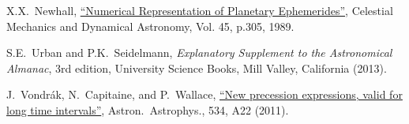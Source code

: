 \documentclass[12pt]{article}
\begin{document}
\begin{CJK}{UTF8}{bkai}
\begin{thebibliography}{Urban \& Seidelmann 2013}
 X.X.~Newhall, 
\href{http://adsabs.harvard.edu/abs/1989CeMec..45..305N}
{``Numerical Representation of Planetary Ephemerides''}, Celestial Mechanics
and Dynamical Astronomy, Vol. 45, p.305, 1989.

 S.E.~Urban and P.K.~Seidelmann, 
{\it Explanatory Supplement to the Astronomical Almanac}, 3rd edition, 
University Science Books, Mill Valley, California (2013).

 J.~Vondr\'ak, N.~Capitaine, and P.~Wallace, 
\href{http://adsabs.harvard.edu/abs/2011A%26A...534A..22V}
{``New precession expressions, valid for long time intervals''}, 
Astron.\ Astrophys., 534, A22 (2011).

\end{thebibliography}

\end{CJK}
\end{document}

